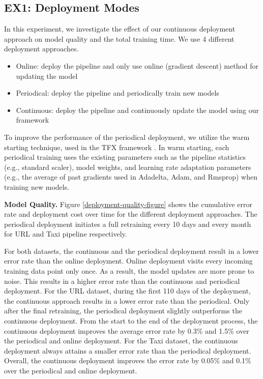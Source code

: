 \subsection{EX1: Deployment Modes}
In this experiment, we investigate the effect of our continuous deployment approach on model quality and the total training time.
We use 4 different deployment approaches.
\begin{itemize}
\item Online: deploy the pipeline and only use online (gradient descent) method for updating the model
\item Periodical: deploy the pipeline and periodically train new models 
\item Continuous: deploy the pipeline and continuously update the model using our framework
\end{itemize}

To improve the performance of the periodical deployment, we utilize the warm starting technique, used in the TFX framework \cite{baylor2017tfx}.
In warm starting, each periodical training uses the existing parameters such as the pipeline statistics (e.g., standard scaler), model weights, and learning rate adaptation parameters (e.g., the average of past gradients used in Adadelta, Adam, and Rmsprop) when training new models.

\textbf{Model Quality. }
Figure \ref{deployment-quality-figure} shows the cumulative error rate and deployment cost over time for the different deployment approaches.
The periodical deployment initiates a full retraining every 10 days and every month for URL and Taxi pipeline respectively.

For both datasets, the continuous and the periodical deployment result in a lower error rate than the online deployment.
Online deployment visits every incoming training data point only once.
As a result, the model updates are more prone to noise.
This results in a higher error rate than the continuous and periodical deployment.
For the URL dataset, during the first 110 days of the deployment, the continuous approach results in a lower error rate than the periodical.
Only after the final retraining, the periodical deployment slightly outperforms the continuous deployment.
From the start to the end of the deployment process, the continuous deployment improves the average error rate by 0.3\% and 1.5\% over the periodical and online deployment.
For the Taxi dataset, the continuous deployment always attains a smaller error rate than the periodical deployment.
Overall, the continuous deployment improves the error rate by 0.05\% and  0.1\% over the periodical and online deployment.

